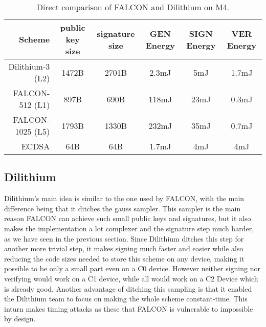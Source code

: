 \documentclass[conference]{IEEEtran}
\newcommand{\comment}[1]{}
\begin{document}
\begin{table*}[]
    \caption{Direct comparison of FALCON and Dilithium on M4. \cite{Energy_comp}}
    \label{t:falconVSdil}
    \centering\begin{tabular}{ | r | c c c c c |}
        \hline
        Scheme & public key size & signature size & GEN Energy & SIGN Energy & VER Energy \\
        \hline
        Dilithium-3 (L2)    & 1472B & 2701B & 2.3mJ & 5mJ   & 1.7mJ \\
        FALCON-512 (L1)     & 897B  & 690B  & 118mJ & 23mJ  & 0.3mJ \\
        FALCON-1025 (L5)    & 1793B & 1330B & 232mJ & 35mJ  & 0.7mJ \\
        \hline
        ECDSA               & 64B   & 64B   & 1.7mJ & 4mJ   & 4mJ \\
        \hline
    \end{tabular}
\end{table*}

\subsection{Dilithium}
\comment{ %
FALCON reaches small pubk and sig since usage of gaussian sampling, - also makes signing hard, dilithium doesnt

runs in constant time - no timing attacks possible \cite{Dilithium}

} %

Dilithium's main idea is similar to the one used by FALCON, with the main difference being that it ditches the gauss sampler.
This sampler is the main reason FALCON can achieve such small public keys and signatures, but it also makes the implementation a lot complexer and the signature step much harder, as we have seen in the previous section. 
Since Dilithium ditches this step for another more trivial step, it makes signing much faster and easier while also reducing the code sizes needed to store this scheme on any device, making it possible to be only a small part even on a C0 device. However neither signing nor verifying would work on a C1 device, while all would work on a C2 Device which is already good.
Another advantage of ditching this sampling is that it enabled the Dilithium team to focus on making the whole scheme constant-time. This inturn makes timing attacks as these that FALCON is vulnerable to impossible by design. \cite{Dilithium}
\end{document}
